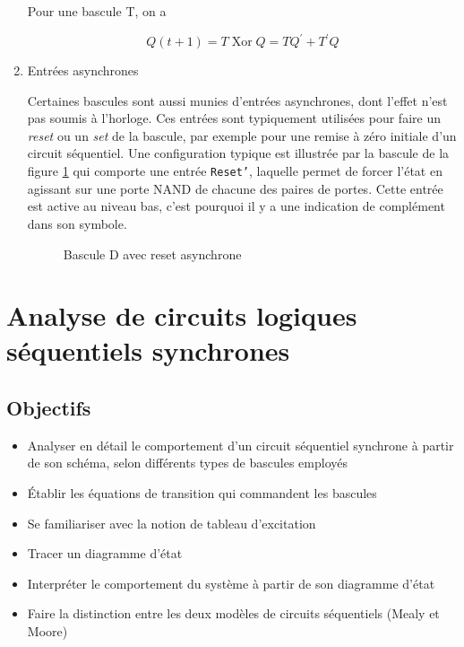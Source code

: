 \documentclass[letter, oneside]{book}
\begin{document}
\begin{enumerate}
Pour une bascule T, on a

$$Q(t+1) = T \operatorname{Xor} Q = T Q^\prime + T^\prime Q$$

\item Entrées asynchrones
\label{sec:orga771b91}

Certaines bascules sont aussi munies d'entrées asynchrones, dont
l'effet n'est pas soumis à l'horloge. Ces entrées sont typiquement
utilisées pour faire un \emph{reset} ou un \emph{set} de la bascule, par exemple
pour une remise à zéro initiale d'un circuit séquentiel. Une
configuration typique est illustrée par la bascule de la figure
\ref{fig:orgc918338} qui comporte une entrée \texttt{Reset'}, laquelle
permet de forcer l'état en agissant sur une porte NAND de chacune des
paires de portes. Cette entrée est active au niveau bas, c'est
pourquoi il y a une indication de complément dans son symbole.

\begin{figure}[htbp]
\centering

\caption{\label{fig:orgc918338}Bascule D avec reset asynchrone}
\end{figure}
\end{enumerate}

\chapter{Analyse de circuits logiques séquentiels synchrones}
\label{sec:orgbbe5739}
\section{Objectifs}
\label{sec:org0f9e62d}
\begin{itemize}
\item Analyser en détail le comportement d'un circuit séquentiel
synchrone à partir de son schéma, selon différents types de bascules
employés
\item Établir les équations de transition qui commandent les bascules
\item Se familiariser avec la notion de tableau d'excitation
\item Tracer un diagramme d'état
\item Interpréter le comportement du système à partir de son
diagramme d'état
\item Faire la distinction entre les deux modèles de circuits séquentiels
(Mealy et Moore)
\end{itemize}
\end{document}
